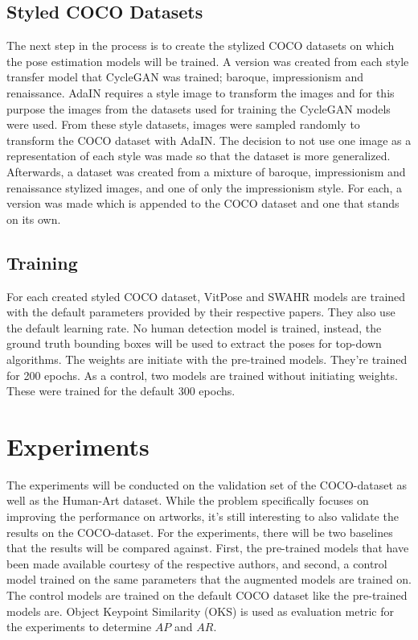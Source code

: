 \documentclass[conference]{IEEEtran}
\begin{document}
\subsection{Styled COCO Datasets}
The next step in the process is to create the stylized COCO datasets on which the pose estimation models will be trained.
A version was created from each style transfer model that CycleGAN was trained; baroque, impressionism and renaissance.
AdaIN requires a style image to transform the images and for this purpose the images from the datasets used for training the CycleGAN models were used.
From these style datasets, images were sampled randomly to transform the COCO dataset with AdaIN.
The decision to not use one image as a representation of each style was made so that the dataset is more generalized.
Afterwards, a dataset was created from a mixture of baroque, impressionism and renaissance stylized images, and one of only the impressionism style.
For each, a version was made which is appended to the COCO dataset and one that stands on its own.

\subsection{Training}
For each created styled COCO dataset, VitPose and SWAHR models are trained with the default parameters provided by their respective papers.
They also use the default learning rate.
No human detection model is trained, instead, the ground truth bounding boxes will be used to extract the poses for top-down algorithms.
The weights are initiate with the pre-trained models.
They're trained for 200 epochs.
As a control, two models are trained without initiating weights.
These were trained for the default 300 epochs.

\section{Experiments}
The experiments will be conducted on the validation set of the COCO-dataset as well as the Human-Art dataset.
While the problem specifically focuses on improving the performance on artworks, it's still interesting to also validate the results on the COCO-dataset.
For the experiments, there will be two baselines that the results will be compared against.
First, the pre-trained models that have been made available courtesy of the respective authors, and second, a control model trained on the same parameters that the augmented models are trained on.
The control models are trained on the default COCO dataset like the pre-trained models are.
Object Keypoint Similarity (OKS) is used as evaluation metric for the experiments to determine $AP$ and $AR$.
\end{document}
